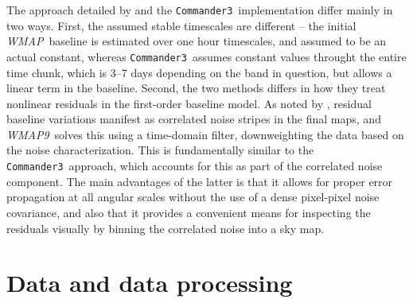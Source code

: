 \documentclass[twocolumn]{../../common/aa}
\def\WMAP{\emph{WMAP}}
\def\WMAPnine{\emph{WMAP9}}
\def\commanderthree{\texttt{Commander3}}
\begin{document}
The approach detailed by \citet{hinshaw2003a} and the
\commanderthree\ implementation differ mainly in two ways. First, the
assumed stable timescales are different -- the initial
\WMAP\ baseline is estimated over one hour timescales, and assumed to
be an actual constant, whereas \commanderthree\ assumes constant values
throught the entire time chunk, which is 3--7 days depending on the
band in question, but allows a linear term in the baseline. Second,
the two methods differs in how they treat nonlinear residuals in the
first-order baseline model.  As noted by \citet{hinshaw2003a},
residual baseline variations manifest as correlated noise stripes in
the final maps, and \WMAPnine\ solves this using a time-domain filter,
downweighting the data based on the noise characterization. This
is fundamentally similar to the \commanderthree\ approach, which
accounts for this as part of the correlated noise component. The main
advantages of the latter is that it allows for proper error
propagation at all angular scales without the use of a dense
pixel-pixel noise covariance, and also that it provides a convenient
means for inspecting the residuals visually by binning the correlated
noise into a sky map.

\section{Data and data processing}
\label{sec:data}
\end{document}
